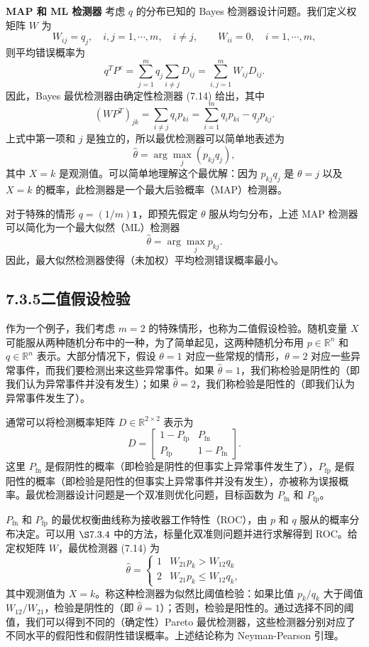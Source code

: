 \documentclass[UTF8,12pt,a4paper,fontset=fandol]{ctexart}
\begin{document}
\noindent\textbf{MAP 和 ML 检测器}\quad
考虑 $q$ 的分布已知的 Bayes 检测器设计问题。我们定义权矩阵 $W$ 为
\[
W_{ij}=q_j,\quad i,j=1,\cdots,m,\quad i\neq j,\qquad
W_{ii}=0,\quad i=1,\cdots,m,
\]
则平均错误概率为
\[
q^TP^e=\sum_{j=1}^m q_j\sum_{i\neq j}D_{ij}=\sum_{i,j=1}^m W_{ij}D_{ij}.
\]
因此，Bayes 最优检测器由确定性检测器 (7.14) 给出，其中
\[
(WP^T)_{jk}=\sum_{i\neq j}q_i p_{ki}=\sum_{i=1}^m q_i p_{ki}-q_jp_{kj}.
\]
上式中第一项和 $j$ 是独立的，所以最优检测器可以简单地表述为
\[
\hat{\theta}=\arg\max_j(p_{kj}q_j),
\]
其中 $X=k$ 是观测值。可以简单地理解这个最优解：因为 $p_{kj}q_j$ 是 $\theta=j$ 以及 $X=k$ 的概率，此检测器是一个最大后验概率（MAP）检测器。

对于特殊的情形 $q=(1/m)\mathbf{1}$，即预先假定 $\theta$ 服从均匀分布，上述 MAP 检测器可以简化为一个最大似然（ML）检测器
\[
\hat{\theta}=\arg\max_j p_{kj}.
\]
因此，最大似然检测器使得（未加权）平均检测错误概率最小。

\subsection*{7.3.5\quad 二值假设检验}

作为一个例子，我们考虑 $m=2$ 的特殊情形，也称为二值假设检验。随机变量 $X$ 可能服从两种随机分布中的一种，为了简单起见，这两种随机分布用 $p\in\mathbb{R}^n$ 和 $q\in\mathbb{R}^n$ 表示。大部分情况下，假设 $\theta=1$ 对应一些常规的情形，$\theta=2$ 对应一些异常事件，而我们要检测出来这些异常事件。如果 $\hat{\theta}=1$，我们称检验是阴性的（即我们认为异常事件并没有发生）；如果 $\hat{\theta}=2$，我们称检验是阳性的（即我们认为异常事件发生了）。

通常可以将检测概率矩阵 $D\in\mathbb{R}^{2\times 2}$ 表示为
\[
D=
\begin{bmatrix}
1-P_{\mathrm{fp}} & P_{\mathrm{fn}}\\
P_{\mathrm{fp}} & 1-P_{\mathrm{fn}}
\end{bmatrix}.
\]
这里 $P_{\mathrm{fn}}$ 是假阴性的概率（即检验是阴性的但事实上异常事件发生了），$P_{\mathrm{fp}}$ 是假阳性的概率（即检验是阳性的但事实上异常事件并没有发生），亦被称为误报概率。最优检测器设计问题是一个双准则优化问题，目标函数为 $P_{\mathrm{fn}}$ 和 $P_{\mathrm{fp}}$。

$P_{\mathrm{fn}}$ 和 $P_{\mathrm{fp}}$ 的最优权衡曲线称为接收器工作特性（ROC），由 $p$ 和 $q$ 服从的概率分布决定。可以用 $\S 7.3.4$ 中的方法，标量化双准则问题并进行求解得到 ROC。给定权矩阵 $W$，最优检测器 (7.14) 为
\[
\hat{\theta}=
\begin{cases}
1 & W_{21}p_k>W_{12}q_k\\
2 & W_{21}p_k\leq W_{12}q_k,
\end{cases}
\]
其中观测值为 $X=k$。称这种检测器为似然比阈值检验：如果比值 $p_k/q_k$ 大于阈值 $W_{12}/W_{21}$，检验是阴性的（即 $\hat{\theta}=1$）；否则，检验是阳性的。通过选择不同的阈值，我们可以得到不同的（确定性）Pareto 最优检测器，这些检测器分别对应了不同水平的假阳性和假阴性错误概率。上述结论称为 Neyman-Pearson 引理。
\end{document}
